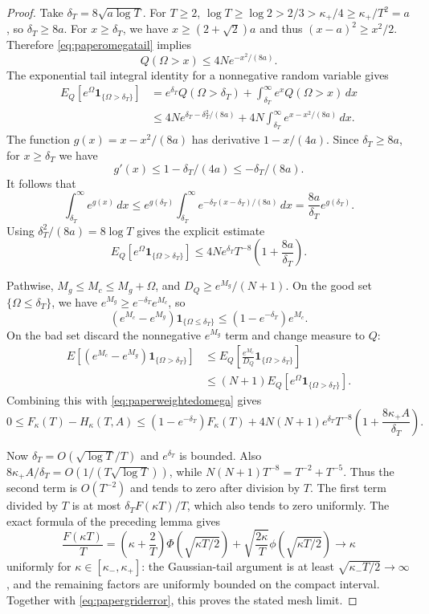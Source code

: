 \documentclass[a4paper,11pt]{article}
\theoremstyle{remark}
\begin{document}
\begin{proof}
Take $\delta_T=8\sqrt{a\log T}$. For $T\ge2$,
$\log T\ge\log2>2/3>\kappa_+/4\ge\kappa_+/T^2=a$, so
$\delta_T\ge8a$. For $x\ge\delta_T$,
we have $x\ge(2+\sqrt2)a$ and thus $(x-a)^2\ge x^2/2$. Therefore
\eqref{eq:paperomegatail} implies
\[
 Q(\Omega>x)\le4Ne^{-x^2/(8a)}.
\]
The exponential tail integral identity for a nonnegative random variable gives
\begin{align*}
 E_Q[e^\Omega\mathbf1_{\{\Omega>\delta_T\}}]
 &=e^{\delta_T}Q(\Omega>\delta_T)
 +\int_{\delta_T}^\infty e^xQ(\Omega>x)\,dx\\
 &\le4N e^{\delta_T-\delta_T^2/(8a)}
 +4N\int_{\delta_T}^\infty e^{x-x^2/(8a)}\,dx.
\end{align*}
The function $g(x)=x-x^2/(8a)$ has derivative $1-x/(4a)$. Since
$\delta_T\ge8a$, for $x\ge\delta_T$ we have
\[
 g'(x)\le1-\delta_T/(4a)\le-\delta_T/(8a).
\]
It follows that
\[
 \int_{\delta_T}^\infty e^{g(x)}\,dx
 \le e^{g(\delta_T)}\int_{\delta_T}^\infty
 e^{-\delta_T(x-\delta_T)/(8a)}\,dx
 =\frac{8a}{\delta_T}e^{g(\delta_T)}.
\]
Using $\delta_T^2/(8a)=8\log T$ gives the explicit estimate
\begin{equation}\label{eq:paperweightedomega}
 E_Q[e^\Omega\mathbf1_{\{\Omega>\delta_T\}}]
 \le4Ne^{\delta_T}T^{-8}\left(1+\frac{8a}{\delta_T}\right).
\end{equation}

Pathwise, $M_g\le M_c\le M_g+\Omega$, and
$D_Q\ge e^{M_g}/(N+1)$. On the good set $\{\Omega\le\delta_T\}$,
we have $e^{M_g}\ge e^{-\delta_T}e^{M_c}$, so
\[
 (e^{M_c}-e^{M_g})\mathbf1_{\{\Omega\le\delta_T\}}
 \le(1-e^{-\delta_T})e^{M_c}.
\]
On the bad set discard the nonnegative $e^{M_g}$ term and change measure to $Q$:
\begin{align*}
 E[(e^{M_c}-e^{M_g})\mathbf1_{\{\Omega>\delta_T\}}]
 &\le E_Q\left[\frac{e^{M_c}}{D_Q}
 \mathbf1_{\{\Omega>\delta_T\}}\right]\\
 &\le(N+1)E_Q[e^\Omega\mathbf1_{\{\Omega>\delta_T\}}].
\end{align*}
Combining this with \eqref{eq:paperweightedomega} gives
\begin{equation}\label{eq:papergriderror}
 0\le F_\kappa(T)-H_\kappa(T,A)
 \le(1-e^{-\delta_T})F_\kappa(T)
 +4N(N+1)e^{\delta_T}T^{-8}
 \left(1+\frac{8\kappa_+A}{\delta_T}\right).
\end{equation}

Now $\delta_T=O(\sqrt{\log T}/T)$ and $e^{\delta_T}$ is bounded. Also
$8\kappa_+A/\delta_T=O(1/(T\sqrt{\log T}))$, while
$N(N+1)T^{-8}=T^{-2}+T^{-5}$. Thus the second term is $O(T^{-2})$
and tends to zero after division by $T$. The first term divided by $T$ is at most
$\delta_T F(\kappa T)/T$, which also tends to zero uniformly.
The exact formula of the preceding lemma gives
\[
 \frac{F(\kappa T)}T
 =\left(\kappa+\frac2T\right)\Phi(\sqrt{\kappa T/2})
 +\sqrt{\frac{2\kappa}{T}}\phi(\sqrt{\kappa T/2})
 \longrightarrow\kappa
\]
uniformly for $\kappa\in[\kappa_-,\kappa_+]$: the Gaussian-tail argument is at least
$\sqrt{\kappa_-T/2}\to\infty$, and the remaining factors are uniformly bounded on the compact interval.
Together with \eqref{eq:papergriderror}, this proves the stated mesh limit.
\end{proof}
\end{document}
